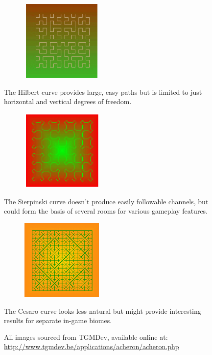\documentclass[12pt,a4paper]{article}
\begin{document}
\begin{figure}[h]
\begin{minipage}{.5\textwidth}
  	\centering
 	\includegraphics[width=6.25cm,height=4cm]{images/hilbert.png}
	\caption[]{The Hilbert curve provides large, easy paths but is limited to just horizontal and vertical degrees of freedom.}
	\label{fig:fig8}
	\end{minipage}
	\begin{minipage}{.5\textwidth}
 	\centering
 	\includegraphics[width=6.25cm,height=4cm]{images/sierpinskicrv.png}
	\caption[]{The Sierpinski curve doesn't produce easily followable channels, but could form the basis of several rooms for various gameplay features.}
	\label{fig:fig9}
	\end{minipage}
	\begin{minipage}{.5\textwidth}
 	\centering
 	\includegraphics[width=6.25cm,height=4cm]{images/cesaro.png}
	\caption[]{The Cesaro curve looks less natural but might provide interesting results for separate in-game biomes.}
	\label{fig:fig10}
	\end{minipage}

	\caption[]{All images sourced from TGMDev, available online at: \url{http://www.tgmdev.be/applications/acheron/acheron.php}}


\end{figure}
\end{document}
